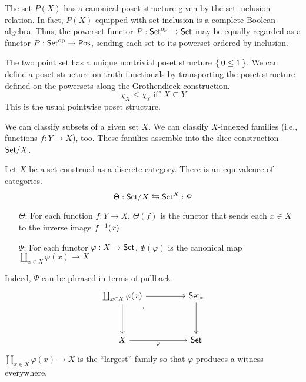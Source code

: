 \documentclass[article,10pt,oneside]{memoir}
\begin{document}
\begin{rmk}
  The set $P(X)$ has a canonical poset structure given by the set inclusion relation.
  In fact, $P(X)$ equipped with set inclusion is a complete Boolean algebra.
  Thus, the powerset functor $P : \mathsf{Set}^{\mathrm{op}} \to \mathsf{Set}$ may be equally regarded as a functor $P : \mathsf{Set}^{\mathrm{op}} \to \mathsf{Pos}$, sending each set to its powerset ordered by inclusion.
\end{rmk}

\begin{rmk}
  The two point set has a unique nontrivial poset structure $\Set{0 \leq 1}$.
  We can define a poset structure on truth functionals by transporting the poset structure defined on the powersets along the Grothendieck construction.
  \[
    \chi_{X} \leq \chi_{Y} \text{ iff } X \subseteq Y
  \]
  This is the usual pointwise poset structure.
\end{rmk}

We can classify subsets of a given set $X$.
We can classify $X$-indexed families (i.e., functions $f : Y \to X$), too.
These families assemble into the slice construction $\mathsf{Set}/X$.

\begin{cons}
  Let $X$ be a set construed as a discrete category.
  There is an equivalence of categories.
  \[
    \Theta : \mathsf{Set}/X \leftrightarrows \mathsf{Set}^{X} : \Psi
  \]
  \begin{itemize}
  \item[$\Theta$:] For each function $f : Y \to X$, $\Theta(f)$ is the functor that sends each $x \in X$ to the inverse image $f^{-1}(x)$.
  \item[$\Psi$:] For each functor $\varphi : X \to \mathsf{Set}$, $\Psi(\varphi)$ is the canonical map $\coprod_{x \in X}\varphi(x) \to X$
  \end{itemize}
\end{cons}

\begin{rmk}
  Indeed, $\Psi$ can be phrased in terms of pullback.
  \[\begin{tikzcd}
      {\coprod_{x \in X}\varphi(x)} && {\CSet_{*}} \\
      \\
      X && \CSet
      \arrow[from=1-3, to=3-3]
      \arrow["\varphi"', from=3-1, to=3-3]
      \arrow[from=1-1, to=3-1]
      \arrow[from=1-1, to=1-3]
      \arrow["\lrcorner"{anchor=center, pos=0.125}, draw=none, from=1-1, to=3-3]
    \end{tikzcd}\]
  $\coprod_{x \in X}\varphi(x) \to X$ is the ``largest'' family so that $\varphi$ produces a witness everywhere.
\end{rmk}
\end{document}
